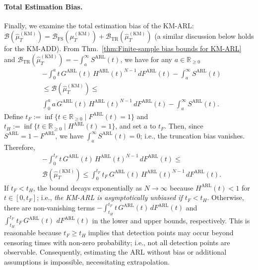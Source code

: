 \documentclass{article}
\theoremstyle{plain}
\theoremstyle{definition}
\theoremstyle{remark}
\def\nn{\nonumber \\ }
\def\mbr{\mathbb{R}}
\begin{document}
\paragraph{Total Estimation Bias.}
Finally, we examine the total estimation bias of the KM-ARL: $\mathcal{B}(\hat{\mu}_T^\mathrm{(KM)}) = \mathcal{B}_\mathrm{FS}(\hat{\mu}_T^\mathrm{(KM)}) + \mathcal{B}_\mathrm{TR}(\hat{\mu}_T^\mathrm{(KM)})$ (a similar discussion below holds for the KM-ADD).
From Thm.~\ref{thm:Finite-sample bias bounds for KM-ARL} and 
$\mathcal{B}_\mathrm{TR}(\hat{\mu}_T^\mathrm{(KM)}) = - \int_a^\infty S^\mathrm{ARL}(t)$,
we have for any $a \in \mbr_{\geq 0}$
\begin{align}
    &-\int_0^{a} t \,G^\mathrm{ARL}(t)\,{H^\mathrm{ARL}}(t)^{N-1}\,dF^\mathrm{ARL}(t) 
        - \int_a^\infty S^\mathrm{ARL}(t) \nn
    &\leq
    \mathcal{B}(\hat{\mu}_T^\mathrm{(KM)})  
    \leq \nn
    & \int_0^{a} a\,G^\mathrm{ARL}(t)\,{H^\mathrm{ARL}}(t)^{N-1}\,dF^\mathrm{ARL}(t)
        - \int_a^\infty S^\mathrm{ARL}(t) .
\end{align}
Define 
$t_F := \inf\{t \in \mbr_{\geq 0} \mid F^\mathrm{ARL}(t) = 1 \}$
and 
$t_H := \inf\{t \in \mbr_{\geq 0} \mid H^\mathrm{ARL}(t) = 1 \}$, and set $a$ to $t_F$.
Then, since $S^\mathrm{ARL} = 1 - F^\mathrm{ARL}$, we have $\int_a^\infty S^\mathrm{ARL}(t) = 0$; i.e., the truncation bias vanishes.
Therefore, 
\begin{align}
    &-\int_0^{t_F} t \,G^\mathrm{ARL}(t)\,{H^\mathrm{ARL}}(t)^{N-1}\,dF^\mathrm{ARL}(t) 
    \leq \nn
    & \mathcal{B}(\hat{\mu}_T^\mathrm{(KM)}) 
    \leq
    \int_0^{t_F} t_F\,G^\mathrm{ARL}(t)\,{H^\mathrm{ARL}}(t)^{N-1}\,dF^\mathrm{ARL}(t).
\end{align}
If $t_F < t_H$, the bound decays exponentially as $N\rightarrow \infty$ because $H^\mathrm{ARL}(t) < 1$ for $t \in [0, t_F]$; i.e., \textit{the KM-ARL is asymptotically unbiased if $t_F < t_H$}.
Otherwise, there are non-vanishing terms 
$-\int_{t_H}^{t_F} t \,G^\mathrm{ARL}(t)\,dF^\mathrm{ARL}(t)$ 
and 
$\int_{t_H}^{t_F} t_F\,G^\mathrm{ARL}(t)\,\,dF^\mathrm{ARL}(t)$ 
in the lower and upper bounds, respectively.
This is reasonable because $t_F \geq t_H$ implies that detection points may occur beyond censoring times with non-zero probability; i.e., not all detection points are observable.
Consequently, estimating the ARL without bias or additional assumptions is impossible, necessitating extrapolation.
\end{document}
